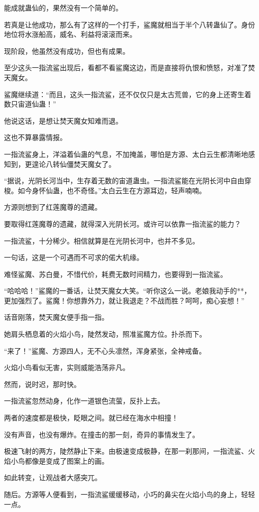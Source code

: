 \begin{this_body}
能成就蛊仙的，果然没有一个简单的。

若真是让他成功，那么有了这样的一个打手，鲨魔就相当于半个八转蛊仙了。身份地位将水涨船高，威名、利益将滚滚而来。

现阶段，他虽然没有成功，但也有成果。

至少这头一指流鲨出现后，看都不看鲨魔这边，而是直接将仇恨和愤怒，对准了焚天魔女。

鲨魔继续道：“而且，这头一指流鲨，还不仅仅只是太古荒兽，它的身上还寄生着数只宙道仙蛊！”

他说这话，是想让焚天魔女知难而退。

这也不算暴露情报。

一指流鲨身上，洋溢着仙蛊的气息，不加掩盖，哪怕是方源、太白云生都清晰地感知到，更遑论八转仙僵焚天魔女了。

“据说，光阴长河当中，生存着无数的宙道蛊虫。一指流鲨能在光阴长河中自由穿梭。如今身怀仙蛊，也不奇怪。”太白云生在方源耳边，轻声喃喃。

方源则想到了红莲魔尊的遗藏。

要取得红莲魔尊的遗藏，就得深入光阴长河。或许可以依靠一指流鲨的能力？

一指流鲨，十分稀少。相信就算是在光阴长河中，也并不多见。

一句话，这是一个可遇而不可求的偌大机缘。

难怪鲨魔、苏白曼，不惜代价，耗费无数时间精力，也要得到一指流鲨。

“哈哈哈！”鲨魔的一番话，让焚天魔女大笑。“听你这么一说。老娘我动手的**，更加强烈了。鲨魔！你想靠外力，就让我退走？不战而胜？呵呵，痴心妄想！”

话音刚落，焚天魔女便手指一指。

她肩头栖息着的火焰小鸟，陡然发动，照准鲨魔方位。扑杀而下。

“来了！”鲨魔、方源四人，无不心头凛然，浑身紧张，全神戒备。

火焰小鸟看似无害，实则威能浩荡非凡。

然而，说时迟，那时快。

一指流鲨忽然动身，化作一道银色流萤，反扑上去。

两者的速度都是极快，眨眼之间。就已经在海水中相撞！

没有声音，也没有爆炸。在撞击的那一刻，奇异的事情发生了。

极速飞射的两方，陡然静止下来。由极速变成极静，在那一刹那间，一指流鲨、火焰小鸟都像是变成了图案上的画。

如此转变，让观战者大感突兀。

随后。方源等人便看到，一指流鲨缓缓移动，小巧的鼻尖在火焰小鸟的身上，轻轻一点。


\end{this_body}
